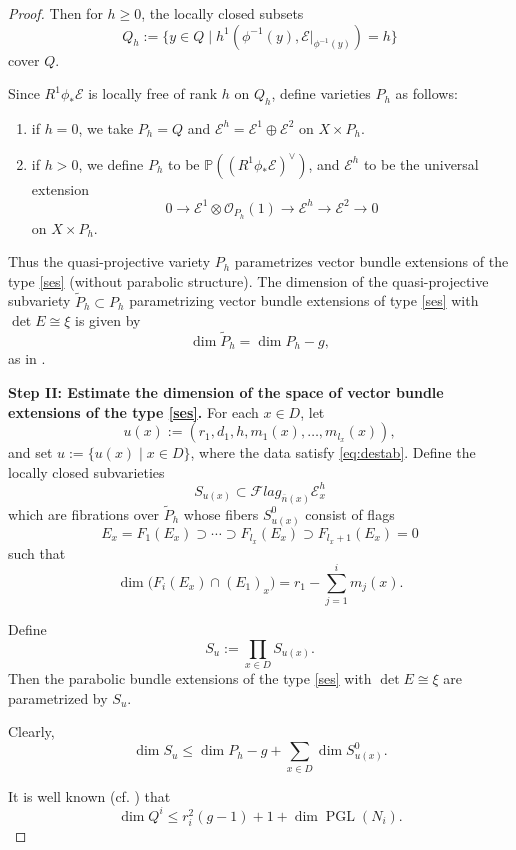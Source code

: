 \documentclass[11pt, reqno]{amsart}
\numberwithin{equation}{section}
\DeclareMathOperator{\PGL}{PGL}
\theoremstyle{definition}
\begin{document}
\begin{proof}
Then for $h \geq 0$, the locally closed subsets
\[
Q_h:= \{ y \in Q \mid h^1(\phi^{-1}(y), \mathcal{E}|_{\phi^{-1}(y)})=h\}
\]
cover $Q$.

Since $R^1\phi_*\mathcal{E}$ is locally free of rank $h$ on $Q_h$, define varieties $P_h$ as follows:
\begin{enumerate}
\item if $h=0$, we take $P_h=Q$ and $\mathcal{E}^h= \mathcal{E}^1 \oplus \mathcal{E}^2$ on $X \times P_h$.
\item if $h>0$, we define $P_h$ to be $\mathbb{P}((R^1\phi_*\mathcal{E})^{\vee})$, and $\mathcal{E}^h$ to be the universal extension
\[
0 \longrightarrow \mathcal{E}^1 \otimes \mathcal{O}_{P_h}(1) \longrightarrow \mathcal{E}^h \longrightarrow \mathcal{E}^2 \longrightarrow 0
\]
on $X \times P_h$.
\end{enumerate}

Thus the quasi-projective variety $P_h$ parametrizes vector bundle extensions of the type \eqref{ses} (without parabolic structure). The dimension of the quasi-projective subvariety $\widetilde{P}_h \subset P_h$ parametrizing vector bundle extensions of type \eqref{ses} with $\det E \cong \xi$ is given by
\[
\dim \widetilde{P}_h= \dim P_h - g,
\]
as in \cite{BB23,S00}.

\noindent \textbf{Step II: Estimate the dimension of the space of vector bundle extensions of the type \eqref{ses}.} 
For each $x \in D$, let 
\[
u(x) := \left(r_1, d_1, h, m_1(x) , \ldots ,m_{l_x}(x) \right),
\]
and set $u:= \{u(x)\mid x \in D\}$, where the data satisfy \eqref{eq:destab}. Define the locally closed subvarieties
\[
S_{u(x)} \subset \mathcal{F}lag_{\overline{n}(x)}\mathcal{E}^h_x
\]
which are fibrations over $\widetilde{P}_h$ whose fibers $S^0_{u(x)}$ consist of flags
\[
E_x=F_1(E_x) \supset \cdots \supset F_{l_x}(E_x) \supset F_{l_x+1}(E_x)=0
\]
such that
\[
\dim \bigl(F_i(E_x) \cap (E_1)_x\bigr) =r_1- \sum_{j=1}^i m_j(x).
\]

Define
\[
S_u:= \prod_{x \in D} S_{u(x)}.
\]
Then the parabolic bundle extensions of the type \eqref{ses} with $\det E \cong \xi$ are parametrized by $S_u$.

Clearly,
\begin{equation}\label{S_u dimension}
\dim S_u \leq \dim P_h - g + \sum_{x \in D} \dim S^0_{u(x)}.
\end{equation}

It is well known (cf. \cite{S00, BB23}) that
\[
\dim Q^i \leq r_i^2(g-1)+1+ \dim \PGL(N_i).
\]


\end{proof}
\end{document}
